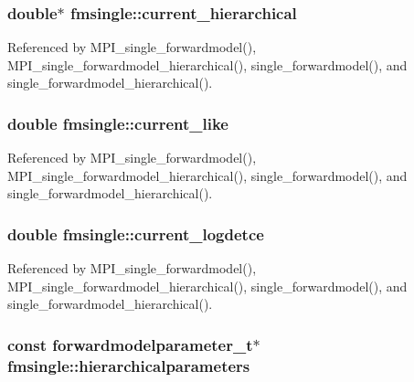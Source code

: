 \subsubsection[{\texorpdfstring{current\+\_\+hierarchical}{current_hierarchical}}]{\setlength{\rightskip}{0pt plus 5cm}double$\ast$ fmsingle\+::current\+\_\+hierarchical}\hypertarget{structfmsingle_adc525ed1a81e4d7f5d687d96af6ce888}{}\label{structfmsingle_adc525ed1a81e4d7f5d687d96af6ce888}


Referenced by M\+P\+I\+\_\+single\+\_\+forwardmodel(), M\+P\+I\+\_\+single\+\_\+forwardmodel\+\_\+hierarchical(), single\+\_\+forwardmodel(), and single\+\_\+forwardmodel\+\_\+hierarchical().

\subsubsection[{\texorpdfstring{current\+\_\+like}{current_like}}]{\setlength{\rightskip}{0pt plus 5cm}double fmsingle\+::current\+\_\+like}\hypertarget{structfmsingle_ace5bdca44f6db9697e6ccb4cc084b212}{}\label{structfmsingle_ace5bdca44f6db9697e6ccb4cc084b212}


Referenced by M\+P\+I\+\_\+single\+\_\+forwardmodel(), M\+P\+I\+\_\+single\+\_\+forwardmodel\+\_\+hierarchical(), single\+\_\+forwardmodel(), and single\+\_\+forwardmodel\+\_\+hierarchical().

\subsubsection[{\texorpdfstring{current\+\_\+logdetce}{current_logdetce}}]{\setlength{\rightskip}{0pt plus 5cm}double fmsingle\+::current\+\_\+logdetce}\hypertarget{structfmsingle_afa03012e995c260d955674113a36f2e5}{}\label{structfmsingle_afa03012e995c260d955674113a36f2e5}


Referenced by M\+P\+I\+\_\+single\+\_\+forwardmodel(), M\+P\+I\+\_\+single\+\_\+forwardmodel\+\_\+hierarchical(), single\+\_\+forwardmodel(), and single\+\_\+forwardmodel\+\_\+hierarchical().

\subsubsection[{\texorpdfstring{hierarchicalparameters}{hierarchicalparameters}}]{\setlength{\rightskip}{0pt plus 5cm}const {\bf forwardmodelparameter\+\_\+t}$\ast$ fmsingle\+::hierarchicalparameters}\hypertarget{structfmsingle_a7f7e040a5e4ad525258791dc802a8d7d}{}\label{structfmsingle_a7f7e040a5e4ad525258791dc802a8d7d}


